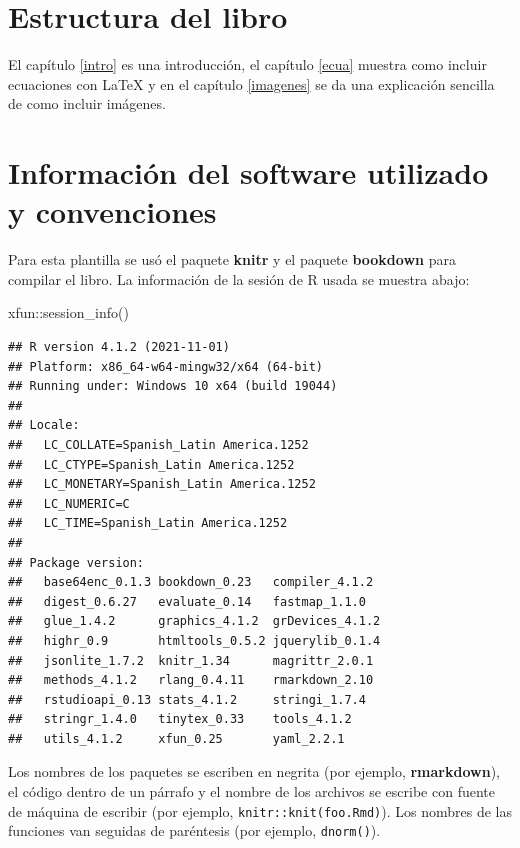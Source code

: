 \documentclass[
]{krantz}
\makeatletter
\newenvironment{Shaded}{\begin{snugshade}}{\end{snugshade}}
\newcommand{\FunctionTok}[1]{\textcolor[rgb]{0,0,0}{#1}}
\newcommand{\NormalTok}[1]{#1}
\newcommand{\SpecialCharTok}[1]{\textcolor[rgb]{0,0,0}{#1}}
\newenvironment{kframe}{%
\medskip{}
\setlength{\fboxsep}{.8em}
 \def\at@end@of@kframe{}%
 \ifinner\ifhmode%
  \def\at@end@of@kframe{\end{minipage}}%
  \begin{minipage}{\columnwidth}%
 \fi\fi%
 \def\FrameCommand##1{\hskip\@totalleftmargin \hskip-\fboxsep
 \colorbox{shadecolor}{##1}\hskip-\fboxsep
     \hskip-\linewidth \hskip-\@totalleftmargin \hskip\columnwidth}%
 \MakeFramed {\advance\hsize-\width
   \@totalleftmargin\z@ \linewidth\hsize
   \@setminipage}}%
 {\par\unskip\endMakeFramed%
 \at@end@of@kframe}
\renewenvironment{Shaded}{\begin{kframe}}{\end{kframe}}
\makeatother
\begin{document}
\hypertarget{estructura-del-libro}{%
\section*{Estructura del libro}\label{estructura-del-libro}}


El capítulo \ref{intro} es una introducción, el capítulo \ref{ecua} muestra como incluir ecuaciones con LaTeX y en el capítulo \ref{imagenes} se da una explicación sencilla de como incluir imágenes.

\hypertarget{informaciuxf3n-del-software-utilizado-y-convenciones}{%
\section*{Información del software utilizado y convenciones}\label{informaciuxf3n-del-software-utilizado-y-convenciones}}


Para esta plantilla se usó el paquete \textbf{knitr} \citep{xie2015} y el paquete \textbf{bookdown} \citep{R-bookdown} para compilar el libro. La información de la sesión de R usada se muestra abajo:

\begin{Shaded}
\begin{Highlighting}[]
\NormalTok{xfun}\SpecialCharTok{::}\FunctionTok{session\_info}\NormalTok{()}
\end{Highlighting}
\end{Shaded}

\begin{verbatim}
## R version 4.1.2 (2021-11-01)
## Platform: x86_64-w64-mingw32/x64 (64-bit)
## Running under: Windows 10 x64 (build 19044)
## 
## Locale:
##   LC_COLLATE=Spanish_Latin America.1252 
##   LC_CTYPE=Spanish_Latin America.1252   
##   LC_MONETARY=Spanish_Latin America.1252
##   LC_NUMERIC=C                          
##   LC_TIME=Spanish_Latin America.1252    
## 
## Package version:
##   base64enc_0.1.3 bookdown_0.23   compiler_4.1.2 
##   digest_0.6.27   evaluate_0.14   fastmap_1.1.0  
##   glue_1.4.2      graphics_4.1.2  grDevices_4.1.2
##   highr_0.9       htmltools_0.5.2 jquerylib_0.1.4
##   jsonlite_1.7.2  knitr_1.34      magrittr_2.0.1 
##   methods_4.1.2   rlang_0.4.11    rmarkdown_2.10 
##   rstudioapi_0.13 stats_4.1.2     stringi_1.7.4  
##   stringr_1.4.0   tinytex_0.33    tools_4.1.2    
##   utils_4.1.2     xfun_0.25       yaml_2.2.1
\end{verbatim}

Los nombres de los paquetes se escriben en negrita (por ejemplo, \textbf{rmarkdown}), el código dentro de un párrafo y el nombre de los archivos se escribe con fuente de máquina de escribir (por ejemplo, \texttt{knitr::knit(\textquotesingle{}foo.Rmd\textquotesingle{})}). Los nombres de las funciones van seguidas de paréntesis (por ejemplo, \texttt{dnorm()}).
\end{document}
